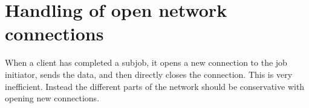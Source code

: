 \section{Handling of open network connections}
When a client has completed a subjob, it opens a new connection to the job initiator, sends the data, and then directly closes the connection.
This is very inefficient. Instead the different parts of the network should be conservative with opening new connections.

